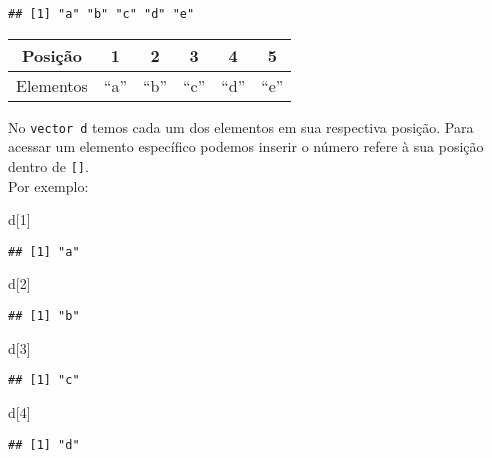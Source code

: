 \documentclass[
]{book}
\newenvironment{Shaded}{\begin{snugshade}}{\end{snugshade}}
\newcommand{\DecValTok}[1]{\textcolor[rgb]{0.00,0.00,0.81}{#1}}
\newcommand{\NormalTok}[1]{#1}
\begin{document}
\begin{verbatim}
## [1] "a" "b" "c" "d" "e"
\end{verbatim}

\begin{longtable}[]{@{}cccccc@{}}
\toprule
Posição & 1 & 2 & 3 & 4 & 5 \\
\midrule
\endhead
Elementos & ``a'' & ``b'' & ``c'' & ``d'' & ``e'' \\
\bottomrule
\end{longtable}

No \texttt{vector\ d} temos cada um dos elementos em sua respectiva posição. Para acessar um elemento específico podemos inserir o número refere à sua posição dentro de \texttt{{[}{]}}.\\
Por exemplo:

\begin{Shaded}
\begin{Highlighting}[]
\NormalTok{d[}\DecValTok{1}\NormalTok{]}
\end{Highlighting}
\end{Shaded}

\begin{verbatim}
## [1] "a"
\end{verbatim}

\begin{Shaded}
\begin{Highlighting}[]
\NormalTok{d[}\DecValTok{2}\NormalTok{]}
\end{Highlighting}
\end{Shaded}

\begin{verbatim}
## [1] "b"
\end{verbatim}

\begin{Shaded}
\begin{Highlighting}[]
\NormalTok{d[}\DecValTok{3}\NormalTok{]}
\end{Highlighting}
\end{Shaded}

\begin{verbatim}
## [1] "c"
\end{verbatim}

\begin{Shaded}
\begin{Highlighting}[]
\NormalTok{d[}\DecValTok{4}\NormalTok{]}
\end{Highlighting}
\end{Shaded}

\begin{verbatim}
## [1] "d"
\end{verbatim}
\end{document}
